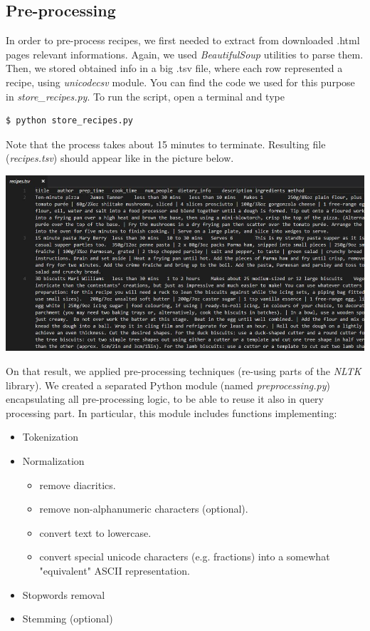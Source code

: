 \subsection{Pre-processing}

In order to pre-process recipes, we first needed to extract from downloaded .html pages relevant informations.  Again, we used \textit{BeautifulSoup}\cite{beaut_soup} utilities to parse them. Then, we stored obtained info in a big .tsv file, where each row represented a recipe, using \textit{unicodecsv}\cite{csv} module. You can find the code we used for this purpose in \textit{store\_recipes.py}. To run the script, open a terminal and type
\begin{lstlisting}
$ python store_recipes.py
\end{lstlisting}
Note that the process takes about 15 minutes to terminate. Resulting file (\textit{recipes.tsv}) should appear like in the picture below.
\begin{center}
	\vspace{5mm}
	\includegraphics[scale=0.5]{img/recipes-tsv.jpg}
\end{center}
On that result, we applied pre-processing techniques (re-using parts of the \textit{NLTK}\cite{nltk} library). We created a separated Python module (named \textit{preprocessing.py}) encapsulating all pre-processing logic, to be able to reuse it also in query processing part. In particular, this module includes functions implementing:
\begin{itemize}
	\item Tokenization
	\item Normalization
	\begin{itemize}
		\item remove diacritics.
		\item remove non-alphanumeric characters (optional).
		\item convert text to lowercase.
		\item convert special unicode characters (e.g. fractions) into a somewhat "equivalent" ASCII representation.
	\end{itemize}
	\item Stopwords removal
	\item Stemming (optional)
\end{itemize}
